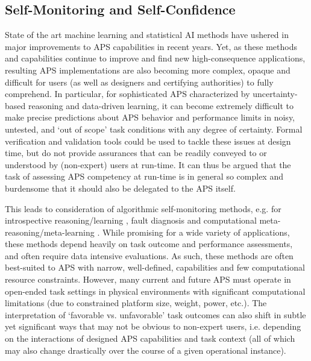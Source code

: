 \subsection{Self-Monitoring and Self-Confidence}
State of the art machine learning and statistical AI methods have ushered in major improvements to APS capabilities in recent years. 
Yet, as these methods and capabilities continue to improve and find new high-consequence applications, resulting APS implementations are also becoming more complex, opaque and difficult for users (as well as designers and certifying authorities) to fully comprehend. 
In particular, for sophisticated APS characterized by uncertainty-based reasoning and data-driven learning, it can become extremely difficult to make precise predictions about APS behavior and performance limits in noisy, untested, and `out of scope' task conditions with any degree of certainty. Formal verification and validation tools could be used to tackle these issues at design time, but do not provide assurances that can be readily conveyed to or understood by (non-expert) users at run-time. 
It can thus be argued that the task of assessing APS competency at run-time is in general so complex and burdensome that it should also be delegated to the APS itself. 

This leads to consideration of algorithmic self-monitoring methods, e.g. for introspective reasoning/learning \cite{Huang2017-lk}, fault diagnosis and computational meta-reasoning/meta-learning \cite{grant2018recasting}. 
While promising for a wide variety of applications, these methods depend heavily on task outcome and performance assessments, and often require data intensive evaluations. 
As such, these methods are often best-suited to APS with narrow, well-defined, capabilities and few computational resource constraints. 
However, many current and future APS must operate in open-ended task settings in physical environments with significant computational limitations (due to constrained platform size, weight, power, etc.). 
The interpretation of `favorable vs. unfavorable' task outcomes can also shift in subtle yet significant ways that may not be obvious to non-expert users, i.e. depending on the interactions of designed APS capabilities and task context (all of which may also change drastically over the course of a given operational instance). 

